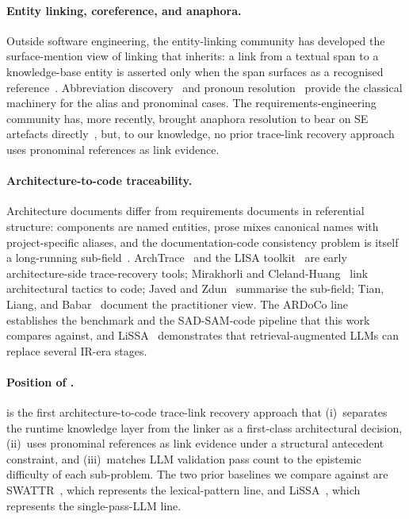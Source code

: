 \paragraph{Entity linking, coreference, and anaphora.}
Outside software engineering, the entity-linking community has developed the surface-mention view of linking that \approach inherits: a link from a textual span to a knowledge-base entity is asserted only when the span surfaces as a recognised reference~\cite{mihalcea2007wikify,bunescu2006using,cucerzan2007large,hachey2013evaluating}.
Abbreviation discovery~\cite{schwartz2003simple} and pronoun resolution~\cite{hobbs1978resolving,lappin1994algorithm,grosz1995centering,mitkov1998robust,soon2001machine} provide the classical machinery for the alias and pronominal cases.
The requirements-engineering community has, more recently, brought anaphora resolution to bear on SE artefacts directly~\cite{yang2011analysing,ezzini2022automated}, but, to our knowledge, no prior trace-link recovery approach uses pronominal references as link evidence.

\paragraph{Architecture-to-code traceability.}
Architecture documents differ from requirements documents in referential structure: components are named entities, prose mixes canonical names with project-specific aliases, and the documentation-code consistency problem is itself a long-running sub-field~\cite{murphy2001software}.
ArchTrace~\cite{murta2008continuous} and the LISA toolkit~\cite{buchgeher2011automatic} are early architecture-side trace-recovery tools; Mirakhorli and Cleland-Huang~\cite{mirakhorli2016detecting} link architectural tactics to code; Javed and Zdun~\cite{javed2014systematic} summarise the sub-field; Tian, Liang, and Babar~\cite{tian2021relationships} document the practitioner view.
The ARDoCo line~\cite{keim_trace_2021,keim_recovering_2024} establishes the benchmark and the SAD-SAM-code pipeline that this work compares against, and LiSSA~\cite{fuchs_lissa_2025} demonstrates that retrieval-augmented LLMs can replace several IR-era stages.

\paragraph{Position of \approach.}
\approach is the first architecture-to-code trace-link recovery approach that (i)~separates the runtime knowledge layer from the linker as a first-class architectural decision, (ii)~uses pronominal references as link evidence under a structural antecedent constraint, and (iii)~matches \ac{LLM} validation pass count to the epistemic difficulty of each sub-problem.
The two prior baselines we compare against are SWATTR~\cite{keim_trace_2021}, which represents the lexical-pattern line, and LiSSA~\cite{fuchs_lissa_2025}, which represents the single-pass-LLM line.
